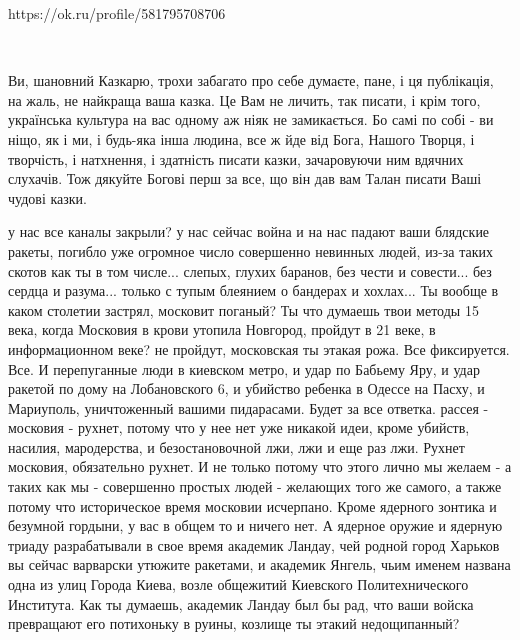  
 
 
 
 


https://ok.ru/profile/581795708706

💙 💛💙 💛💙 💛💙 💛💙 💛💙
💙 💛💙 💛💙 💛💙 💛💙 💛💙
💙 💛💙 💛💙 💛💙 💛💙 💛💙
💙 💛💙 💛💙 💛💙 💛💙 💛💙
💙 💛💙 💛💙 💛💙 💛💙 💛💙
💙 💛💙 💛💙 💛💙 💛💙 💛💙

Ви, шановний Казкарю, трохи забагато про себе думаєте, пане, і ця публікація,
на жаль, не найкраща ваша казка. Це Вам не личить, так писати, і крім того,
українська культура на вас одному аж ніяк не замикається. Бо самі по собі - ви
ніщо, як і ми, і будь-яка інша людина, все ж йде від Бога, Нашого Творця, і
творчість, і натхнення, і здатність писати казки, зачаровуючи ним вдячних
слухачів. Тож дякуйте Богові перш за все, що він дав вам Талан писати Ваші
чудові казки.

у нас все каналы закрыли? у нас сейчас война и на нас падают ваши блядские
ракеты, погибло уже огромное число совершенно невинных людей, из-за таких
скотов как ты в том числе... слепых, глухих баранов, без чести и совести... без
сердца и разума... только с тупым блеянием о бандерах и хохлах... Ты вообще в
каком столетии застрял, московит поганый? Ты что думаешь твои методы 15 века,
когда Московия в крови утопила Новгород, пройдут в 21 веке, в информационном
веке? не пройдут, московская ты этакая рожа. Все фиксируется. Все. И
перепуганные люди в киевском метро, и удар по Бабьему Яру, и удар ракетой по
дому на Лобановского 6, и убийство ребенка в Одессе на Пасху, и Мариуполь,
уничтоженный вашими пидарасами. Будет за все ответка. рассея - московия -
рухнет, потому что у нее нет уже никакой идеи, кроме убийств, насилия,
мародерства, и безостановочной лжи, лжи и еще раз лжи. Рухнет московия,
обязательно рухнет. И не только потому что этого лично мы желаем - а таких как
мы - совершенно простых людей - желающих того же самого, а также потому что
историческое время московии исчерпано. Кроме ядерного зонтика и безумной
гордыни, у вас в общем то и ничего нет. А ядерное оружие и ядерную триаду
разрабатывали в свое время академик Ландау, чей родной город Харьков вы сейчас
варварски утюжите ракетами, и академик Янгель, чьим именем названа одна из улиц
Города Киева, возле общежитий Киевского Политехнического Института. Как ты
думаешь, академик Ландау был бы рад, что ваши войска превращают его потихоньку
в руины, козлище ты этакий недощипанный?

